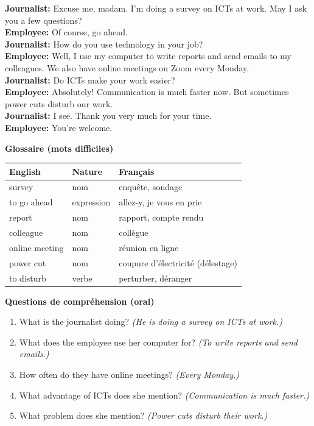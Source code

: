 \documentclass[11pt]{article}
\begin{document}
\begin{textebox}
\textbf{Journalist:} Excuse me, madam. I'm doing a survey on ICTs at work. May I ask you a few questions?\\
\textbf{Employee:} Of course, go ahead.\\
\textbf{Journalist:} How do you use technology in your job?\\
\textbf{Employee:} Well, I use my computer to write reports and send emails to my colleagues. We also have online meetings on Zoom every Monday.\\
\textbf{Journalist:} Do ICTs make your work easier?\\
\textbf{Employee:} Absolutely! Communication is much faster now. But sometimes power cuts disturb our work.\\
\textbf{Journalist:} I see. Thank you very much for your time.\\
\textbf{Employee:} You're welcome.
\end{textebox}

\textbf{Glossaire (mots difficiles)}

\begin{center}
\begin{tabularx}{\linewidth}{|l|l|X|}
\hline
\rowcolor{popblueL} English & Nature & Français \\
\hline
survey & nom & enquête, sondage \\
\hline
to go ahead & expression & allez-y, je vous en prie \\
\hline
report & nom & rapport, compte rendu \\
\hline
colleague & nom & collègue \\
\hline
online meeting & nom & réunion en ligne \\
\hline
power cut & nom & coupure d'électricité (délestage) \\
\hline
to disturb & verbe & perturber, déranger \\
\hline
\end{tabularx}
\end{center}

\textbf{Questions de compréhension (oral)}

\begin{enumerate}
\item What is the journalist doing? \emph{(He is doing a survey on ICTs at work.)}
\item What does the employee use her computer for? \emph{(To write reports and send emails.)}
\item How often do they have online meetings? \emph{(Every Monday.)}
\item What advantage of ICTs does she mention? \emph{(Communication is much faster.)}
\item What problem does she mention? \emph{(Power cuts disturb their work.)}
\end{enumerate}
\end{document}
